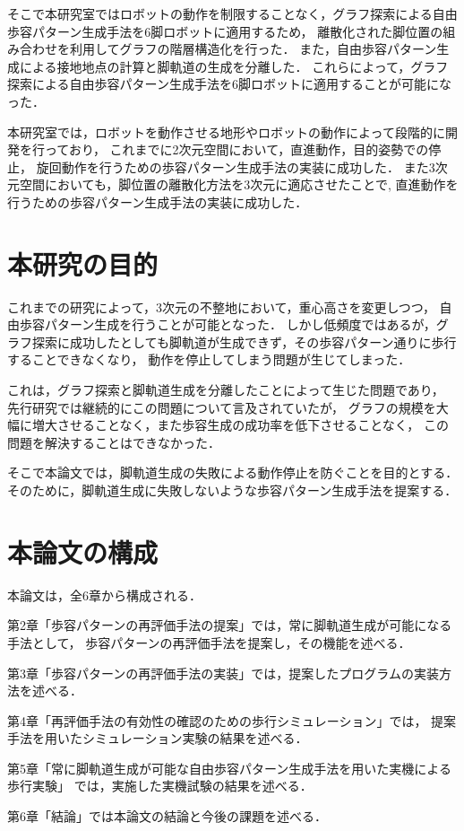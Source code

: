 そこで本研究室ではロボットの動作を制限することなく，グラフ探索による自由歩容パターン生成手法を6脚ロボットに適用するため，
離散化された脚位置の組み合わせを利用してグラフの階層構造化を行った．
また，自由歩容パターン生成による接地地点の計算と脚軌道の生成を分離した．
これらによって，グラフ探索による自由歩容パターン生成手法を6脚ロボットに適用することが可能になった．

本研究室では，ロボットを動作させる地形やロボットの動作によって段階的に開発を行っており，
これまでに2次元空間において，直進動作\cite{Oki_Graph_search}，目的姿勢での停止\cite{Nakaoka_Graph_search}，
旋回動作\cite{Shina_Graph_search}を行うための歩容パターン生成手法の実装に成功した．
また3次元空間においても，脚位置の離散化方法を3次元に適応させたことで\cite{Miura_Graph_search},
直進動作\cite{Hato_Graph_search}を行うための歩容パターン生成手法の実装に成功した．

\section{本研究の目的}
これまでの研究によって，3次元の不整地において，重心高さを変更しつつ，
自由歩容パターン生成を行うことが可能となった．
しかし低頻度ではあるが，グラフ探索に成功したとしても脚軌道が生成できず，その歩容パターン通りに歩行することできなくなり，
動作を停止してしまう問題が生じてしまった．

これは，グラフ探索と脚軌道生成を分離したことによって生じた問題であり，
先行研究では継続的にこの問題について言及されていたが，
グラフの規模を大幅に増大させることなく，また歩容生成の成功率を低下させることなく，
この問題を解決することはできなかった．

そこで本論文では，脚軌道生成の失敗による動作停止を防ぐことを目的とする．
そのために，脚軌道生成に失敗しないような歩容パターン生成手法を提案する．

\section{本論文の構成}
本論文は，全6章から構成される．

第2章「歩容パターンの再評価手法の提案」では，常に脚軌道生成が可能になる手法として，
歩容パターンの再評価手法を提案し，その機能を述べる．

第3章「歩容パターンの再評価手法の実装」では，提案したプログラムの実装方法を述べる．

第4章「再評価手法の有効性の確認のための歩行シミュレーション」では，
提案手法を用いたシミュレーション実験の結果を述べる．

第5章「常に脚軌道生成が可能な自由歩容パターン生成手法を用いた実機による歩行実験」
では，実施した実機試験の結果を述べる．

第6章「結論」では本論文の結論と今後の課題を述べる．
